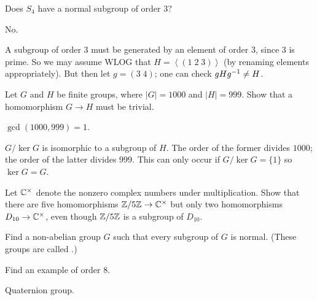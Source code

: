 \begin{problem}
	Does $S_4$ have a normal subgroup of order $3$?
	\begin{hint}
		No.
	\end{hint}
	\begin{sol}
		A subgroup of order $3$ must be generated by
		an element of order $3$, since $3$ is prime.
		So we may assume WLOG that $H = \left< (1\; 2 \; 3) \right>$
		(by renaming elements appropriately).
		But then let $g = (3 \; 4)$; one can check $gHg^{-1} \ne H$.
	\end{sol}
\end{problem}

\begin{problem}
	Let $G$ and $H$ be finite groups, where $\left\lvert G \right\rvert = 1000$
	and $\left\lvert H \right\rvert = 999$.
	Show that a homomorphism $G \to H$ must be trivial.
	\begin{hint}
		$\gcd(1000,999)=1$.
	\end{hint}
	\begin{sol}
		$G/\ker G$ is isomorphic to a subgroup of $H$.
		The order of the former divides $1000$;
		the order of the latter divides $999$.
		This can only occur if $G / \ker G = \{1\}$
		so $\ker G = G$.
	\end{sol}
\end{problem}

\begin{problem}
	Let $\mathbb C^\times$ denote the nonzero complex numbers under multiplication.
	Show that there are five homomorphisms $\mathbb Z/5\mathbb Z \to \mathbb C^\times$
	but only two homomorphisms $D_{10} \to \mathbb C^\times$,
	even though $\mathbb Z/5\mathbb Z$ is a subgroup of $D_{10}$.
\end{problem}

\begin{problem}
	\gim
	Find a non-abelian group $G$
	such that every subgroup of $G$ is normal.
	(These groups are called .)
	\begin{hint}
		Find an example of order $8$.
	\end{hint}
	\begin{sol}
		Quaternion group.
	\end{sol}
\end{problem}

